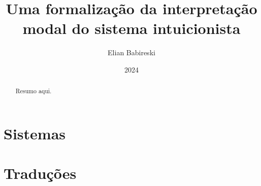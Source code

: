 \documentclass{report}
\begin{document}
    \title{Uma formalização da interpretação modal do sistema intuicionista}
    \author{Elian Babireski}
    \date{2024}

    \maketitle

    \begin{abstract}
        Resumo aqui.
    \end{abstract}

    \tableofcontents

    
    
    

    \chapter{Sistemas}
        
        
        
        
        

    \chapter{Traduções}
        
        
        

    
    
\end{document}
